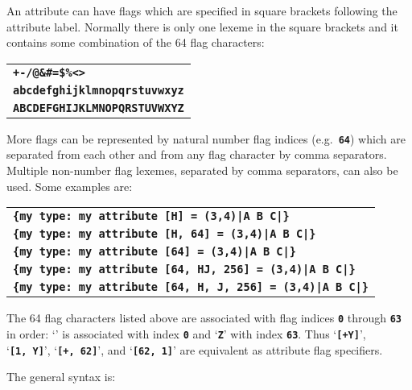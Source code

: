 \documentclass[12pt]{article}
\newcommand{\TT}[1]{{\tt \bfseries #1}}
\begin{document}
An attribute can have flags which are specified
in square brackets following the attribute label.
Normally there is only one lexeme in the square brackets
and it contains some combination of the 64 flag characters:
\begin{center}
\begin{tabular}{l}
\TT{*+-/@\&\#=\$\%<>} \\
\TT{abcdefghijklmnopqrstuvwxyz} \\
\TT{ABCDEFGHIJKLMNOPQRSTUVWXYZ} \\
\end{tabular}
\end{center}
More flags can be represented by natural number flag indices
(e.g.~\TT{64}) which are separated from each other
and from any flag character by comma separators.
Multiple non-number flag lexemes, separated by comma separators,
can also be used.  Some examples are:
\begin{center}
\begin{tabular}{l}
\TT{\{my type:~my attribute [H] = (3,4)|A B C|\}} \\
\TT{\{my type:~my attribute [H, 64] = (3,4)|A B C|\}} \\
\TT{\{my type:~my attribute [64] = (3,4)|A B C|\}} \\
\TT{\{my type:~my attribute [64, HJ, 256] = (3,4)|A B C|\}} \\
\TT{\{my type:~my attribute [64, H, J, 256] = (3,4)|A B C|\}} \\
\end{tabular}
\end{center}

The 64 flag characters listed above are associated with flag
indices \TT{0} through \TT{63} in order: `\TT{*}' is associated
with index \TT{0} and `\TT{Z}' with index \TT{63}.
Thus `\TT{[+Y]}', `\TT{[1,~Y]}', `\TT{[+,~62]}', and `\TT{[62,~1]}'
are equivalent as attribute flag specifiers.


The general syntax is:
\end{document}
